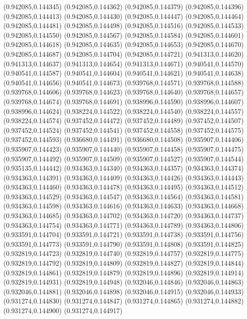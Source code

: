 (0.942085,0.144345)
(0.942085,0.144362)
(0.942085,0.144379)
(0.942085,0.144396)
(0.942085,0.144413)
(0.942085,0.144430)
(0.942085,0.144447)
(0.942085,0.144464)
(0.942085,0.144481)
(0.942085,0.144498)
(0.942085,0.144516)
(0.942085,0.144533)
(0.942085,0.144550)
(0.942085,0.144567)
(0.942085,0.144584)
(0.942085,0.144601)
(0.942085,0.144618)
(0.942085,0.144635)
(0.942085,0.144653)
(0.942085,0.144670)
(0.942085,0.144687)
(0.942085,0.144704)
(0.942085,0.144721)
(0.941313,0.144620)
(0.941313,0.144637)
(0.941313,0.144654)
(0.941313,0.144671)
(0.940541,0.144570)
(0.940541,0.144587)
(0.940541,0.144604)
(0.940541,0.144621)
(0.940541,0.144638)
(0.940541,0.144656)
(0.940541,0.144673)
(0.939768,0.144571)
(0.939768,0.144588)
(0.939768,0.144606)
(0.939768,0.144623)
(0.939768,0.144640)
(0.939768,0.144657)
(0.939768,0.144674)
(0.939768,0.144691)
(0.938996,0.144590)
(0.938996,0.144607)
(0.938996,0.144624)
(0.938224,0.144522)
(0.938224,0.144540)
(0.938224,0.144557)
(0.938224,0.144574)
(0.937452,0.144472)
(0.937452,0.144489)
(0.937452,0.144507)
(0.937452,0.144524)
(0.937452,0.144541)
(0.937452,0.144558)
(0.937452,0.144575)
(0.937452,0.144593)
(0.936680,0.144491)
(0.936680,0.144508)
(0.935907,0.144406)
(0.935907,0.144423)
(0.935907,0.144440)
(0.935907,0.144458)
(0.935907,0.144475)
(0.935907,0.144492)
(0.935907,0.144509)
(0.935907,0.144527)
(0.935907,0.144544)
(0.935135,0.144442)
(0.934363,0.144340)
(0.934363,0.144357)
(0.934363,0.144374)
(0.934363,0.144391)
(0.934363,0.144409)
(0.934363,0.144426)
(0.934363,0.144443)
(0.934363,0.144460)
(0.934363,0.144478)
(0.934363,0.144495)
(0.934363,0.144512)
(0.934363,0.144529)
(0.934363,0.144547)
(0.934363,0.144564)
(0.934363,0.144581)
(0.934363,0.144598)
(0.934363,0.144616)
(0.934363,0.144633)
(0.934363,0.144668)
(0.934363,0.144685)
(0.934363,0.144702)
(0.934363,0.144720)
(0.934363,0.144737)
(0.934363,0.144754)
(0.934363,0.144771)
(0.934363,0.144789)
(0.934363,0.144806)
(0.933591,0.144704)
(0.933591,0.144721)
(0.933591,0.144738)
(0.933591,0.144756)
(0.933591,0.144773)
(0.933591,0.144790)
(0.933591,0.144808)
(0.933591,0.144825)
(0.932819,0.144723)
(0.932819,0.144740)
(0.932819,0.144757)
(0.932819,0.144775)
(0.932819,0.144792)
(0.932819,0.144809)
(0.932819,0.144827)
(0.932819,0.144844)
(0.932819,0.144861)
(0.932819,0.144879)
(0.932819,0.144896)
(0.932819,0.144914)
(0.932819,0.144931)
(0.932819,0.144948)
(0.932046,0.144846)
(0.932046,0.144863)
(0.932046,0.144881)
(0.932046,0.144898)
(0.932046,0.144915)
(0.932046,0.144933)
(0.931274,0.144830)
(0.931274,0.144847)
(0.931274,0.144865)
(0.931274,0.144882)
(0.931274,0.144900)
(0.931274,0.144917)
